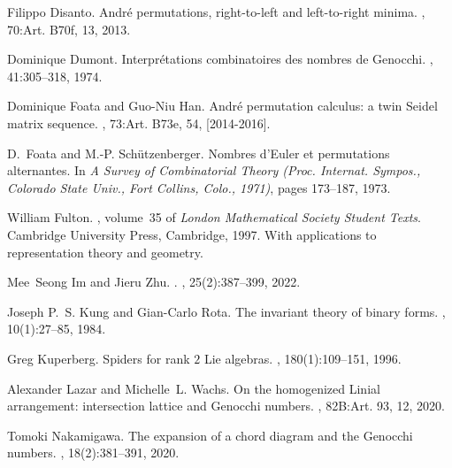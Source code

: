

\begin{thebibliography}{Dum74}

  Filippo Disanto.
  \newblock Andr\'{e} permutations, right-to-left and left-to-right minima.
  , 70:Art. B70f, 13, 2013.
  
  Dominique Dumont.
  \newblock Interpr\'{e}tations combinatoires des nombres de {G}enocchi.
  , 41:305--318, 1974.
  
  Dominique Foata and Guo-Niu Han.
  \newblock Andr\'{e} permutation calculus: a twin {S}eidel matrix sequence.
  , 73:Art. B73e, 54, [2014-2016].
  
  D.~Foata and M.-P. Sch\"{u}tzenberger.
  \newblock Nombres d'{E}uler et permutations alternantes.
  \newblock In {\em A Survey of Combinatorial Theory ({P}roc. {I}nternat.
    {S}ympos., {C}olorado {S}tate {U}niv., {F}ort {C}ollins, {C}olo., 1971)},
    pages 173--187, 1973.
  
  William Fulton.
  , volume~35 of {\em London Mathematical Society
    Student Texts}.
  \newblock Cambridge University Press, Cambridge, 1997.
  \newblock With applications to representation theory and geometry.
  
  Mee~Seong Im and Jieru Zhu.
  .
  , 25(2):387--399, 2022.
  
  Joseph P.~S. Kung and Gian-Carlo Rota.
  \newblock The invariant theory of binary forms.
  , 10(1):27--85, 1984.
  
  Greg Kuperberg.
  \newblock Spiders for rank {$2$} {L}ie algebras.
  , 180(1):109--151, 1996.
  
  Alexander Lazar and Michelle~L. Wachs.
  \newblock On the homogenized {L}inial arrangement: intersection lattice and
    {G}enocchi numbers.
  , 82B:Art. 93, 12, 2020.
  
  Tomoki Nakamigawa.
  \newblock The expansion of a chord diagram and the {G}enocchi numbers.
  , 18(2):381--391, 2020.
  

\end{thebibliography}
